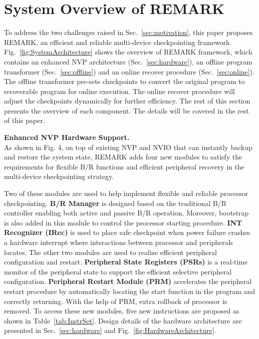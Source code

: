 \section{System Overview of REMARK} \label{sec:system}
%
To address the two challenges raised in Sec.~\ref{sec:motivation}, this paper proposes REMARK, an efficient and reliable multi-device checkpointing framework.
Fig.~\ref{fig:SystemArchitecture} shows the overview of REMARK framework, which contains an enhanced NVP architecture (Sec.~\ref{sec:hardware}), an offline program transformer (Sec.~\ref{sec:offline}) and an online recover procedure (Sec.~\ref{sec:online}).
The offline transformer pre-sets checkpoints to convert the original program to recoverable program for online execution.
The online recover procedure will adjust the checkpoints dynamically for further efficiency.
The rest of this section presents the overview of each component.
The details will be covered in the rest of this paper. 

\vspace{5pt}
\noindent\textbf{Enhanced NVP Hardware Support.} \\
As shown in Fig. 4, on top of existing NVP and NVIO that can instantly backup and restore the system state, REMARK adds four new modules to satisfy the requirements for flexible B/R functions and efficient peripheral recovery in the multi-device checkpointing strategy.

Two of these modules are used to help implement flexible and reliable processor checkpointing.
\textbf{B/R Manager} is designed based on the traditional B/R controller enabling both active and passive B/R operation.
Moreover, bootstrap is also added in this module to control the processor starting procedure.
\textbf{INT Recognizer (IRec)} is used to place safe checkpoint when power failure crashes a hardware interrupt where interactions between processor and peripherals locates.
The other two modules are used to realize efficient peripheral configuration and restart.
\textbf{Peripheral State Registers (PSRs)} is a real-time monitor of the peripheral state to support the efficient selective peripheral configuration.
\textbf{Peripheral Restart Module (PRM)} accelerates the peripheral restart procedure by automatically locating the start function in the program and correctly returning.
With the help of PRM, extra rollback of processor is removed.
To access these new modules, five new instructions are proposed as shown in Table~\ref{tab:InstrSet}.
Design details of the hardware architecture are presented in Sec.~\ref{sec:hardware} and Fig.~\ref{fig:HardwareArchitecture}.


